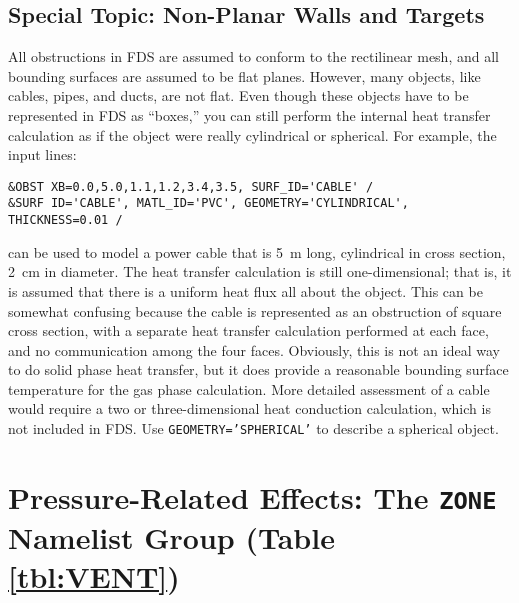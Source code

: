 \documentclass[11pt]{book}
\newcommand{\ct}{\tt\small}
\begin{document}
\subsection{Special Topic: Non-Planar Walls and Targets}

All obstructions in FDS are assumed to conform to the rectilinear
mesh, and all bounding surfaces are assumed to be flat
planes. However, many objects, like cables, pipes, and ducts, are not
flat. Even though these objects have to be represented in FDS as
``boxes,'' you can still perform the internal heat transfer
calculation as if the object were really cylindrical or spherical. For
example, the input lines:

\footnotesize
\begin{verbatim}
&OBST XB=0.0,5.0,1.1,1.2,3.4,3.5, SURF_ID='CABLE' /
&SURF ID='CABLE', MATL_ID='PVC', GEOMETRY='CYLINDRICAL', THICKNESS=0.01 /
\end{verbatim} \normalsize

\noindent
can be used to model a power cable that is 5~m long, cylindrical in
cross section, 2~cm in diameter. The heat transfer calculation is
still one-dimensional; that is, it is assumed that there is a uniform
heat flux all about the object. This can be somewhat confusing because
the cable is represented as an obstruction of square cross section,
with a separate heat transfer calculation performed at each face, and
no communication among the four faces. Obviously, this is not an ideal
way to do solid phase heat transfer, but it does provide a reasonable
bounding surface temperature for the gas phase calculation. More
detailed assessment of a cable would require a two or
three-dimensional heat conduction calculation, which is not included
in FDS. Use {\ct GEOMETRY='SPHERICAL'} to describe a spherical object.







\clearpage

\section{Pressure-Related Effects: The \texorpdfstring{{\tt ZONE}}{ZONE} Namelist Group (Table \ref{tbl:VENT})}
\label{info:ZONE}  
\end{document}
